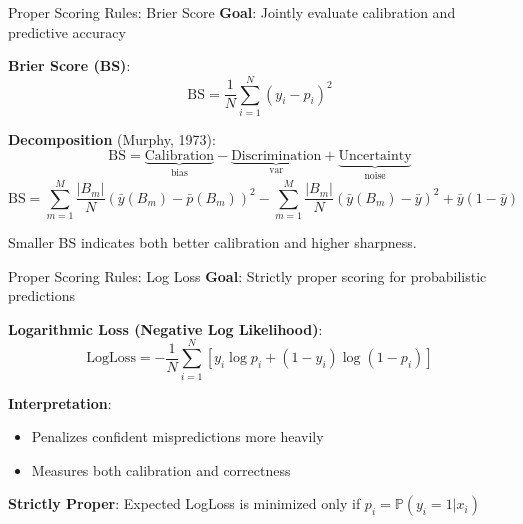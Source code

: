\documentclass[11pt,compress,t,notes=noshow, aspectratio=169, xcolor=table]{beamer}
\begin{document}







\begin{frame}{Proper Scoring Rules: Brier Score}
\textbf{Goal}: Jointly evaluate calibration and predictive accuracy

\medskip
\textbf{Brier Score (BS)}:
\[
\mathrm{BS} = \frac{1}{N} \sum_{i=1}^N (y_i - p_i)^2
\]

\medskip
\textbf{Decomposition} (Murphy, 1973):
\[
\mathrm{BS} = \underbrace{\text{Calibration}}_{\mathrm{bias}} - \underbrace{\text{Discrimination}}_{\mathrm{var}} + \underbrace{\text{Uncertainty}}_{\mathrm{noise}}
\]
\[
\mathrm{BS} = \sum_{m=1}^M \frac{|B_m|}{N} (\bar{y}(B_m) - \bar{p}(B_m))^2 - \sum_{m=1}^M \frac{|B_m|}{N} (\bar{y}(B_m) - \bar{y})^2 + \bar{y}(1 - \bar{y})
\]

\medskip
Smaller BS indicates both better calibration and higher sharpness.
\end{frame}

\begin{frame}{Proper Scoring Rules: Log Loss}
\textbf{Goal}: Strictly proper scoring for probabilistic predictions

\medskip
\textbf{Logarithmic Loss (Negative Log Likelihood)}:
\[
\mathrm{LogLoss} = -\frac{1}{N} \sum_{i=1}^N \left[ y_i \log p_i + (1 - y_i) \log (1 - p_i) \right]
\]

\medskip
\textbf{Interpretation}:
\begin{itemize}
    \item Penalizes confident mispredictions more heavily
    \item Measures both calibration and correctness
\end{itemize}

\medskip
\textbf{Strictly Proper}:
Expected LogLoss is minimized only if $p_i = \mathbb{P}(y_i=1|x_i)$
\end{frame}


\endlecture
\end{document}
